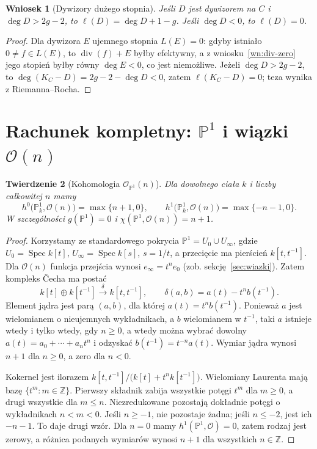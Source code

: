 \documentclass[11pt,a4paper,openany]{report}
\numberwithin{equation}{section}
\theoremstyle{plain}
\newtheorem{twierdzenie}{Twierdzenie}[section]
\newtheorem{wniosek}[twierdzenie]{Wniosek}
\theoremstyle{definition}
\theoremstyle{remark}
\newcommand{\Z}{\mathbb Z}
\newcommand{\PP}{\mathbb P}
\newcommand{\Spec}{\operatorname{Spec}}
\begin{document}
\begin{wniosek}[Dywizory dużego stopnia]
Jeśli $D$ jest dywizorem na $C$ i $\deg D>2g-2$,
to $\ell(D)=\deg D+1-g$.
Jeśli $\deg D<0$, to $\ell(D)=0$.
\end{wniosek}
\begin{proof}
Dla dywizora $E$ ujemnego stopnia $L(E)=0$:
gdyby istniało $0\ne f\in L(E)$, to
$\operatorname{div}(f)+E$ byłby efektywny,
a z wniosku~\ref{wn:div-zero} jego stopień byłby
równy $\deg E<0$, co jest niemożliwe.
Jeżeli $\deg D>2g-2$, to
$\deg(K_C-D)=2g-2-\deg D<0$,
zatem $\ell(K_C-D)=0$; teza wynika z Riemanna--Rocha.
\end{proof}

\section{Rachunek kompletny: \texorpdfstring{$\PP^1$}{P1} i wiązki \texorpdfstring{$\mathcal O(n)$}{O(n)}}
\label{sec:pp1-rr}

\begin{twierdzenie}[Kohomologia $\mathcal O_{\PP^1}(n)$]
\label{tw:p1-coh}
Dla dowolnego ciała $k$ i liczby całkowitej $n$
mamy
\[
 h^0\bigl(\PP^1_k,\mathcal O(n)\bigr)=\max\{n+1,0\},\qquad
 h^1\bigl(\PP^1_k,\mathcal O(n)\bigr)=\max\{-n-1,0\}.
\]
W szczególności $g(\PP^1)=0$ i
$\chi(\PP^1,\mathcal O(n))=n+1$.
\end{twierdzenie}
\begin{proof}
Korzystamy ze standardowego pokrycia
$\PP^1=U_0\cup U_\infty$, gdzie
$U_0=\Spec k[t]$, $U_\infty=\Spec k[s]$,
$s=1/t$, a przecięcie ma pierścień
$k[t,t^{-1}]$. Dla $\mathcal O(n)$
funkcja przejścia wynosi $e_\infty=t^ne_0$
(zob. sekcję~\ref{sec:wiazki}). Zatem kompleks
Čecha ma postać
\[
 k[t]\oplus k[t^{-1}]
 \xrightarrow{\delta}
 k[t,t^{-1}],\qquad
 \delta(a,b)=a(t)-t^n b(t^{-1}).
\]
Element jądra jest parą $(a,b)$, dla której
$a(t)=t^n b(t^{-1})$. Ponieważ $a$ jest
wielomianem o nieujemnych wykładnikach,
a $b$ wielomianem w $t^{-1}$,
taki $a$ istnieje wtedy i tylko wtedy, gdy
$n\ge0$, a wtedy można wybrać dowolny
$a(t)=a_0+\cdots+a_nt^n$ i odzyskać
$b(t^{-1})=t^{-n}a(t)$. Wymiar jądra wynosi
$n+1$ dla $n\ge0$, a zero dla $n<0$.

Kokernel jest ilorazem
$k[t,t^{-1}]/\bigl(k[t]+t^n k[t^{-1}]\bigr)$.
Wielomiany Laurenta mają bazę $\{t^m:m\in\Z\}$.
Pierwszy składnik zabija wszystkie potęgi
$t^m$ dla $m\ge0$, a drugi wszystkie dla
$m\le n$. Niezredukowane pozostają dokładnie
potęgi o wykładnikach $n<m<0$.
Jeśli $n\ge-1$, nie pozostaje żadna;
jeśli $n\le-2$, jest ich $-n-1$.
To daje drugi wzór. Dla $n=0$ mamy
$h^1(\PP^1,\mathcal O)=0$, zatem rodzaj jest zerowy,
a różnica podanych wymiarów wynosi $n+1$
dla wszystkich $n\in\Z$.
\end{proof}
\end{document}
